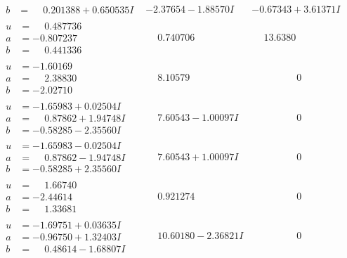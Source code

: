\documentclass[1p]{elsarticle_modified}
\theoremstyle{definition}
\begin{document}
$$\begin{array}{c|c|c}
\begin{aligned}
b &= \phantom{-}0.201388 + 0.650535 I\end{aligned}
 & -2.37654 - 1.88570 I & -0.67343 + 3.61371 I \\ \hline\begin{aligned}
u &= \phantom{-}0.487736\phantom{ +0.000000I} \\
a &= -0.807237\phantom{ +0.000000I} \\
b &= \phantom{-}0.441336\phantom{ +0.000000I}\end{aligned}
 & \phantom{-}0.740706\phantom{ +0.000000I} & \phantom{-}13.6380\phantom{ +0.000000I} \\ \hline\begin{aligned}
u &= -1.60169\phantom{ +0.000000I} \\
a &= \phantom{-}2.38830\phantom{ +0.000000I} \\
b &= -2.02710\phantom{ +0.000000I}\end{aligned}
 & \phantom{-}8.10579\phantom{ +0.000000I} & \phantom{-0.000000 } 0 \\ \hline\begin{aligned}
u &= -1.65983 + 0.02504 I \\
a &= \phantom{-}0.87862 + 1.94748 I \\
b &= -0.58285 - 2.35560 I\end{aligned}
 & \phantom{-}7.60543 - 1.00097 I & \phantom{-0.000000 } 0 \\ \hline\begin{aligned}
u &= -1.65983 - 0.02504 I \\
a &= \phantom{-}0.87862 - 1.94748 I \\
b &= -0.58285 + 2.35560 I\end{aligned}
 & \phantom{-}7.60543 + 1.00097 I & \phantom{-0.000000 } 0 \\ \hline\begin{aligned}
u &= \phantom{-}1.66740\phantom{ +0.000000I} \\
a &= -2.44614\phantom{ +0.000000I} \\
b &= \phantom{-}1.33681\phantom{ +0.000000I}\end{aligned}
 & \phantom{-}0.921274\phantom{ +0.000000I} & \phantom{-0.000000 } 0 \\ \hline\begin{aligned}
u &= -1.69751 + 0.03635 I \\
a &= -0.96750 + 1.32403 I \\
b &= \phantom{-}0.48614 - 1.68807 I\end{aligned}
 & \phantom{-}10.60180 - 2.36821 I & \phantom{-0.000000 } 0 \\ \hline\begin{aligned}

\end{aligned}
\end{array}$$
\end{document}
